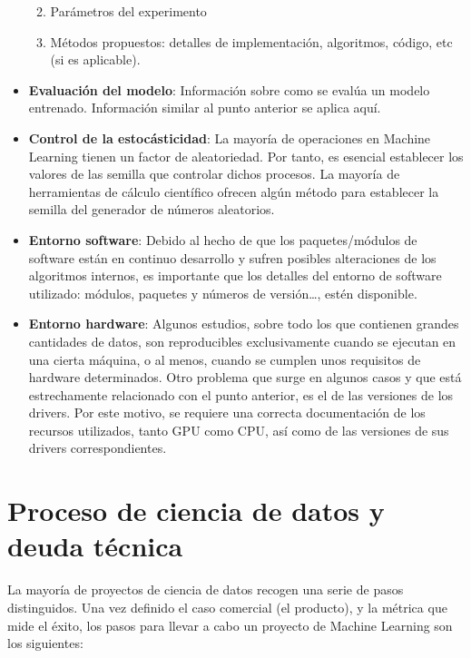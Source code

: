 \documentclass[
  12pt,
  a4paperpaper,
]{report}
\providecommand{\tightlist}{%
  \setlength{\itemsep}{0pt}\setlength{\parskip}{0pt}}
\begin{document}
\begin{itemize}
  \begin{enumerate}
  \def\labelenumi{\arabic{enumi}.}
  \tightlist
  \item
    Parámetros del experimento
  \item
    Métodos propuestos: detalles de implementación, algoritmos, código,
    etc (si es aplicable).
  \end{enumerate}
\item
  \textbf{Evaluación del modelo}: Información sobre como se evalúa un
  modelo entrenado. Información similar al punto anterior se aplica
  aquí.
\item
  \textbf{Control de la estocásticidad}: La mayoría de operaciones en
  Machine Learning tienen un factor de aleatoriedad. Por tanto, es
  esencial establecer los valores de las semilla que controlar dichos
  procesos. La mayoría de herramientas de cálculo científico ofrecen
  algún método para establecer la semilla del generador de números
  aleatorios.
\item
  \textbf{Entorno software}: Debido al hecho de que los paquetes/módulos
  de software están en continuo desarrollo y sufren posibles
  alteraciones de los algoritmos internos, es importante que los
  detalles del entorno de software utilizado: módulos, paquetes y
  números de versión\ldots, estén disponible.
\item
  \textbf{Entorno hardware}: Algunos estudios, sobre todo los que
  contienen grandes cantidades de datos, son reproducibles
  exclusivamente cuando se ejecutan en una cierta máquina, o al menos,
  cuando se cumplen unos requisitos de hardware determinados. Otro
  problema que surge en algunos casos y que está estrechamente
  relacionado con el punto anterior, es el de las versiones de los
  drivers. Por este motivo, se requiere una correcta documentación de
  los recursos utilizados, tanto GPU como CPU, así como de las versiones
  de sus drivers correspondientes.
\end{itemize}

\hypertarget{proceso-de-ciencia-de-datos-y-deuda-tuxe9cnica}{%
\section{Proceso de ciencia de datos y deuda
técnica}\label{proceso-de-ciencia-de-datos-y-deuda-tuxe9cnica}}

La mayoría de proyectos de ciencia de datos recogen una serie de pasos
distinguidos. Una vez definido el caso comercial (el producto), y la
métrica que mide el éxito, los pasos para llevar a cabo un proyecto de
Machine Learning son los siguientes:
\end{document}
